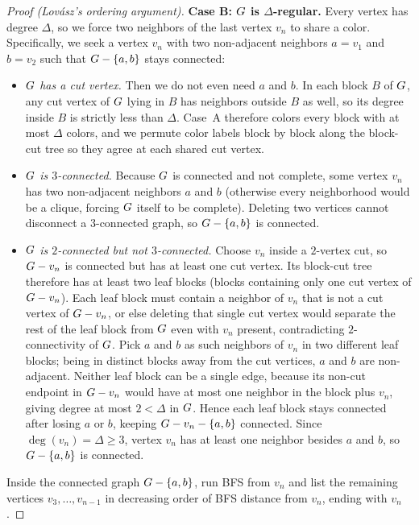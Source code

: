 \begin{proof}[Proof (Lov\'asz's ordering argument)]
\textbf{Case B: $G$ is $\Delta$-regular.} Every vertex has degree $\Delta$, so we force two neighbors of the last vertex $v_n$ to share a color. Specifically, we seek a vertex $v_n$ with two non-adjacent
neighbors $a=v_1$ and $b=v_2$ such that $G-\{a,b\}$ stays connected:
\begin{itemize}
  \item \emph{$G$ has a cut vertex.} Then we do not even need $a$ and $b$. In each
        block $B$ of $G$, any cut vertex of $G$ lying in $B$ has neighbors outside $B$ as well, so its degree inside $B$ is strictly less than $\Delta$. Case~A therefore colors every
        block with at most $\Delta$ colors, and we permute color labels block by block along the block-cut tree
        so they agree at each shared cut vertex.
  \item \emph{$G$ is $3$-connected.} Because $G$ is connected and not complete, some
        vertex $v_n$ has two non-adjacent neighbors $a$ and $b$ (otherwise every neighborhood would be a clique, forcing $G$ itself to be complete). Deleting two vertices
        cannot disconnect a $3$-connected graph, so $G-\{a,b\}$ is connected.
  \item \emph{$G$ is $2$-connected but not $3$-connected.} Choose $v_n$ inside a
        $2$-vertex cut, so $G-v_n$ is connected but has at least one cut vertex. Its block-cut
        tree therefore has at least two leaf blocks (blocks containing only one cut vertex of $G-v_n$). Each leaf block must contain a neighbor of
        $v_n$ that is not a cut vertex of $G-v_n$, or else deleting that single cut
        vertex would separate the rest of the leaf block from $G$ even with $v_n$ present, contradicting $2$-connectivity of $G$. Pick $a$ and $b$ as such neighbors of $v_n$ in two different leaf
        blocks; being in distinct blocks away from the cut vertices, $a$ and $b$ are non-adjacent. Neither leaf block can be a single edge, because its non-cut endpoint in $G-v_n$ would have at most one neighbor in the block plus $v_n$, giving degree at most $2<\Delta$ in $G$. Hence each leaf block stays connected after losing $a$ or $b$, keeping $G-v_n-\{a,b\}$ connected. Since $\deg(v_n)=\Delta\ge 3$, vertex $v_n$ has at least one neighbor besides $a$ and $b$, so
        $G-\{a,b\}$ is connected.
\end{itemize}
Inside the connected graph $G-\{a,b\}$, run BFS from $v_n$ and list the remaining vertices $v_3,\dots,v_{n-1}$ in decreasing order of BFS distance from $v_n$, ending with $v_n$.


\end{proof}
